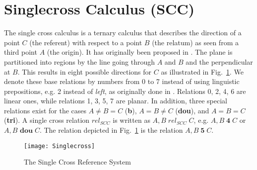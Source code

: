 
\section{Singlecross Calculus (SCC)}\label{sec:single-cross}


The single cross calculus is a ternary calculus that describes the direction of
a point $C$ (the referent) with respect to a point $B$ (the relatum) as seen
from a third point $A$ (the origin). It has originally been proposed in
\citet{cosyfre92}. The plane is partitioned into regions by the line going
through $A$ and $B$ and the perpendicular at $B$. This results in eight
possible directions for $C$ as illustrated in Fig.~\ref{fig:SCC}. We denote
these base relations by numbers from 0 to 7 instead of using linguistic
prepositions, e.g. 2 instead of \emph{left}, as originally done in
\citet{cosyfre92}. Relations 0, 2, 4, 6 are linear ones, while relations 1, 3,
5, 7 are planar. In addition, three special relations exist for the cases $A\neq
B=C$ (\textbf{b}), $A=B \neq C$ (\textbf{dou}), and $A=B=C$ (\textbf{tri}). A
single cross relation $rel_{SCC}$ is written as $A,B \; rel_{SCC}\; C$,
e.g. $A,B\; \textbf{4}\; C$ or $A,B\,\, \textbf{dou}\; C$. The relation depicted in Fig.~\ref{fig:SCC} is the relation $A,B\; \textbf{5}\; C$.

\begin{figure}[ht]
	\centering
	\texttt{[image: Singlecross]}
	\caption{The Single Cross Reference System}
	\label{fig:SCC}
\end{figure}
